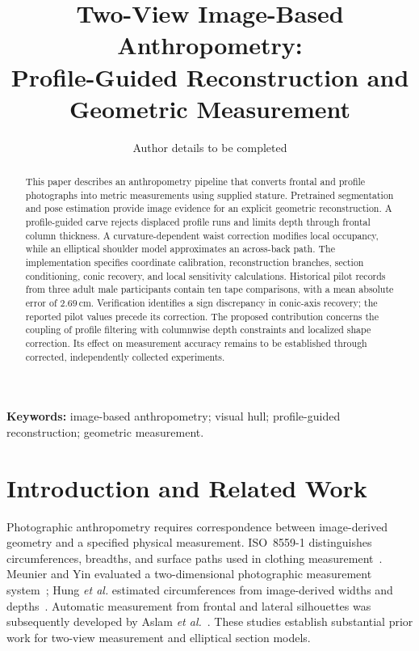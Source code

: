 \documentclass[11pt,a4paper]{article}
\title{Two-View Image-Based Anthropometry:\\
Profile-Guided Reconstruction and Geometric Measurement}
\author{Author details to be completed}
\date{}
\begin{document}
\maketitle

\begin{abstract}
This paper describes an anthropometry pipeline that converts frontal and profile photographs into metric measurements using supplied stature. Pretrained segmentation and pose estimation provide image evidence for an explicit geometric reconstruction. A profile-guided carve rejects displaced profile runs and limits depth through frontal column thickness. A curvature-dependent waist correction modifies local occupancy, while an elliptical shoulder model approximates an across-back path. The implementation specifies coordinate calibration, reconstruction branches, section conditioning, conic recovery, and local sensitivity calculations. Historical pilot records from three adult male participants contain ten tape comparisons, with a mean absolute error of $2.69$\,cm. Verification identifies a sign discrepancy in conic-axis recovery; the reported pilot values precede its correction. The proposed contribution concerns the coupling of profile filtering with columnwise depth constraints and localized shape correction. Its effect on measurement accuracy remains to be established through corrected, independently collected experiments.
\end{abstract}
\noindent\textbf{Keywords:} image-based anthropometry; visual hull; profile-guided reconstruction; geometric measurement.

\section{Introduction and Related Work}
Photographic anthropometry requires correspondence between image-derived geometry and a specified physical measurement. ISO~8559-1 distinguishes circumferences, breadths, and surface paths used in clothing measurement~\cite{iso8559}. Meunier and Yin evaluated a two-dimensional photographic measurement system~\cite{meunier2000}; Hung \emph{et al.} estimated circumferences from image-derived widths and depths~\cite{hung2004}. Automatic measurement from frontal and lateral silhouettes was subsequently developed by Aslam \emph{et al.}~\cite{aslam2017}. These studies establish substantial prior work for two-view measurement and elliptical section models.
\end{document}
